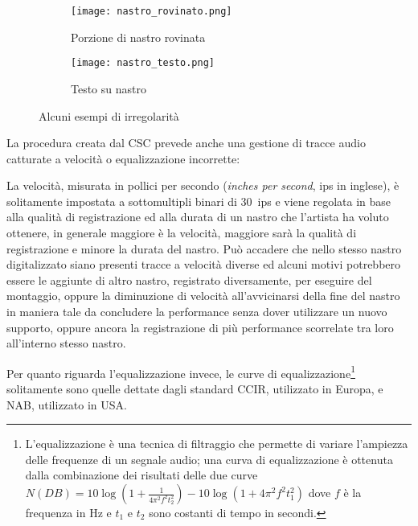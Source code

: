 \begin{figure}
     \centering
     \begin{subfigure}{0.4\textwidth}
         \centering
         \texttt{[image: nastro\_rovinato.png]}
         \caption{Porzione di nastro rovinata \cite{prettoComputingMethodologiesSupporting2018}}
         \label{fig:nastro-rovinato}
     \end{subfigure}
     \hfill
     \begin{subfigure}{0.4\textwidth}
         \centering
         \texttt{[image: nastro\_testo.png]}
         \caption{Testo su nastro \cite{canazzaGestureMusicComputer2022}}
         \label{fig:nastro-testo}
     \end{subfigure}
        \caption{Alcuni esempi di irregolarità}
        \label{fig:nastro-irrs}
\end{figure}

La procedura creata dal \ac{CSC} prevede anche una gestione di tracce audio catturate a velocità o equalizzazione incorrette:

La velocità, misurata in pollici per secondo (\textit{inches per second}, ips in inglese), è solitamente impostata a sottomultipli binari di \qty{30}{ips} e viene regolata in base alla qualità di registrazione ed alla durata di un nastro che l'artista ha voluto ottenere, in generale maggiore è la velocità, maggiore sarà la qualità di registrazione e minore la durata del nastro.
Può accadere che nello stesso nastro digitalizzato siano presenti tracce a velocità diverse ed alcuni motivi potrebbero essere le aggiunte di altro nastro, registrato diversamente, per eseguire del montaggio, oppure la diminuzione di velocità all'avvicinarsi della fine del nastro in maniera tale da concludere la performance senza dover utilizzare un nuovo supporto, oppure ancora la registrazione di più performance scorrelate tra loro all'interno stesso nastro.

Per quanto riguarda l'equalizzazione invece, le curve di equalizzazione\footnote{L'equalizzazione è una tecnica di filtraggio che permette di variare l'ampiezza delle frequenze di un segnale audio; una curva di equalizzazione è ottenuta dalla combinazione dei risultati delle due curve $N(DB)=10 \log(1 + \frac{1}{4 \pi^2 f^2 t_2^2}) - 10 \log(1+4\pi^2 f^2 t_1^2)$ dove $f$ è la frequenza in \unit{\Hz} e $t_1$ e $t_2$ sono costanti di tempo in secondi.} solitamente sono quelle dettate dagli standard \acs{CCIR}, utilizzato in Europa, e \acs{NAB}, utilizzato in USA.

